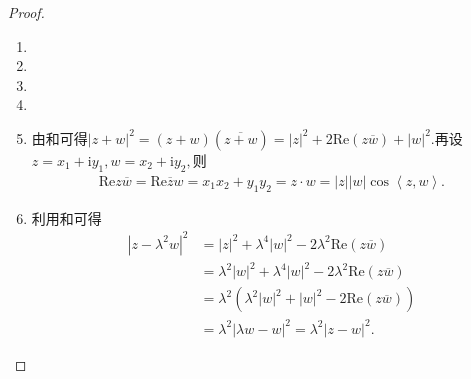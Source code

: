 \documentclass[../../main.tex]{subfiles}%
\begin{document}
\begin{proof}
\begin{enumerate}[(1)]
\item 

\item 

\item

\item

\item 由和可得$|z + w|^2 = (z + w)(\overline{z + w}) = |z|^2 + 2\mathrm{Re}(z\overline{w}) + |w|^2.$再设$z=x_1+\mathrm{i}y_1,w=x_2+\mathrm{i}y_2,$则
\begin{align*}
\mathrm{Re}z\overline{w}=\mathrm{Re}\overline{z}w=x_1x_2+y_1y_2=z\cdot w=\left| z \right|\left| w \right|\cos \left< z,w \right>.
\end{align*}

\item 利用和可得
\begin{align*}
\left| z-\lambda ^2w \right|^2&=\left| z \right|^2+\lambda ^4\left| w \right|^2-2\lambda ^2\mathrm{Re}\left( z\overline{w} \right) 
\\
&=\lambda ^2\left| w \right|^2+\lambda ^4\left| w \right|^2-2\lambda ^2\mathrm{Re}\left( z\overline{w} \right) 
\\
&=\lambda ^2\left( \lambda ^2\left| w \right|^2+\left| w \right|^2-2\mathrm{Re}\left( z\overline{w} \right) \right) 
\\
&=\lambda ^2\left| \lambda w-w \right|^2=\lambda ^2\left| z-w \right|^2.
\end{align*}
\end{enumerate}
\end{proof}
\end{document}

